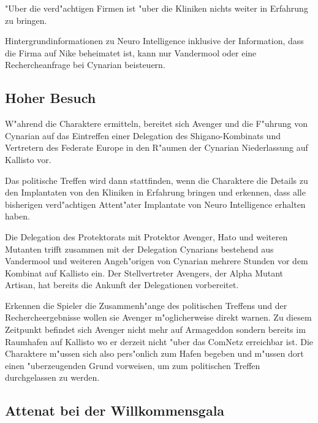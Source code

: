"Uber die verd"achtigen Firmen ist "uber die Kliniken nichts weiter in Erfahrung zu bringen.

\begin{remarks}
	Hintergrundinformationen zu Neuro Intelligence inklusive der Information, dass die Firma auf Nike beheimatet ist, kann nur Vandermool oder eine Rechercheanfrage bei Cynarian beisteuern.
\end{remarks}

\subsection{Hoher Besuch}

W"ahrend die Charaktere ermitteln, bereitet sich Avenger und die F"uhrung von Cynarian auf das Eintreffen einer Delegation des Shigano-Kombinats und Vertretern des Federate Europe in den R"aumen der Cynarian Niederlassung auf Kallisto vor.

Das politische Treffen wird dann stattfinden, wenn die Charaktere die Details zu den Implantaten von den Kliniken in
Erfahrung bringen und erkennen, dass alle bisherigen verd"achtigen Attent"ater Implantate von Neuro Intelligence
erhalten haben.

Die Delegation des Protektorats mit Protektor Avenger, Hato und weiteren Mutanten trifft zusammen mit der Delegation Cynarians bestehend aus Vandermool und weiteren Angeh"origen von Cynarian mehrere Stunden vor dem Kombinat auf Kallisto
ein. Der Stellvertreter Avengers, der Alpha Mutant Artisan, hat bereits die Ankunft der Delegationen vorbereitet.

\begin{remarks}
	Erkennen die Spieler die Zusammenh"ange des politischen Treffens und der Rechercheergebnisse wollen sie Avenger m"oglicherweise direkt warnen. Zu diesem Zeitpunkt befindet sich Avenger nicht mehr auf Armageddon sondern bereits im Raumhafen auf Kallisto wo er derzeit nicht "uber das ComNetz erreichbar ist. Die Charaktere m"ussen sich also pers"onlich zum Hafen begeben und m"ussen dort einen "uberzeugenden Grund vorweisen, um zum politischen Treffen durchgelassen zu werden.
\end{remarks}

\subsection{Attenat bei der Willkommensgala}

